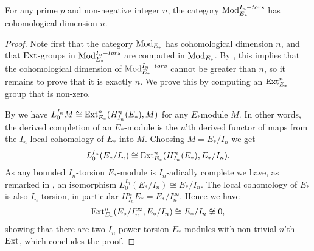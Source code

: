 \begin{lemma}
    \label{ch2:lm:cohomological-dimension-torsion-modules}
    For any prime $p$ and non-negative integer $n$, the category $\mathrm{Mod}_{E_*}^{I_n-tors}$ has cohomological dimension $n$. 
\end{lemma}
\begin{proof}
    Note first that the category $\mathrm{Mod}_{E_*}$ has cohomological dimension $n$, and that $\operatorname{Ext}$-groups in $\mathrm{Mod}_{E_*}^{I_n-tors}$ are computed in $\mathrm{Mod}_{E_*}$. By \cite[2.1.4]{brodmann-sharp_1998}, this implies that the cohomological dimension of $\mathrm{Mod}_{E_*}^{I_n-tors}$ cannot be greater than $n$, so it remains to prove that it is exactly $n$. We prove this by computing an $\operatorname{Ext}^n_{E_*}$ group that is non-zero.
    
    By \cite[A.2(d)]{hovey-strickland_99} we have $L^{I_n}_0 M \cong \operatorname{Ext}_{E_*}^n(H_{I_n}^n(E_*), M)$ for any $E_*$module $M$. In other words, the derived completion of an $E_*$-module is the $n$'th derived functor of maps from the $I_n$-local cohomology of $E_*$ into $M$. Choosing $M=E_*/I_n$ we get 
    $$L^{I_n}_0 (E_*/I_n)\cong \operatorname{Ext}_{E_*}^n(H^n_{I_n}(E_*), E_*/I_n).$$
    As any bounded $I_n$-torsion $E_*$-module is $I_n$-adically complete we have, as remarked in \cite[1.4]{barthel-heard_16}, an isomorphism $L^{I_n}_0 (E_*/I_n)\cong E_*/I_n$. The local cohomology of $E_*$ is also $I_n$-torsion, in particular $H_{I_n}^n E_* = E_*/I_n^\infty$. Hence we have 
    $$\operatorname{Ext}_{E_*}^n(E_*/I_n^\infty, E_*/I_n)\cong E_*/I_n \not \cong 0,$$
    showing that there are two $I_n$-power torsion $E_*$-modules with non-trivial $n$'th $\operatorname{Ext}$, which concludes the proof.
\end{proof}

